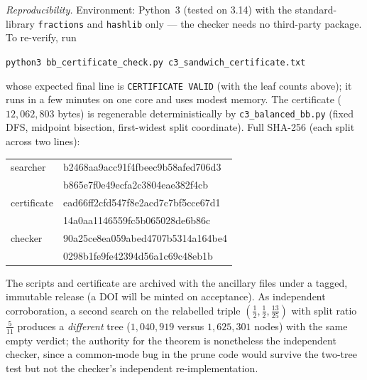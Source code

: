 \documentclass[11pt,reqno]{amsart}
\theoremstyle{plain}
\theoremstyle{definition}
\theoremstyle{remark}
\begin{document}
\emph{Reproducibility.} Environment: Python~3 (tested on 3.14) with the
standard-library \texttt{fractions} and \texttt{hashlib} only --- the checker
needs no third-party package. To re-verify, run
\begin{center}
\texttt{python3 bb\_certificate\_check.py c3\_sandwich\_certificate.txt}
\end{center}
whose expected final line is \texttt{CERTIFICATE VALID} (with the leaf counts
above); it runs in a few minutes on one core and uses modest memory. The certificate
($12{,}062{,}803$ bytes) is regenerable deterministically by
\texttt{c3\_balanced\_bb.py} (fixed DFS, midpoint bisection, first-widest split
coordinate). Full SHA-256 (each split across two lines):
\begin{center}\ttfamily\footnotesize
\begin{tabular}{@{}ll@{}}
searcher & b2468aa9acc91f4fbeec9b58afed706d3\\
 & b865e7f0e49ecfa2c3804eae382f4cb\\
certificate & ead66ff2cfd547f8e2acd7c7bf5cce67d1\\
 & 14a0aa1146559fc5b065028de6b86c\\
checker & 90a25ce8ea059abed4707b5314a164be4\\
 & 0298b1fe9fe42394d56a1c69c48eb1b\\
\end{tabular}
\end{center}
The scripts and certificate are archived with the ancillary files under a
tagged, immutable release (a DOI will be minted on acceptance). As independent
corroboration, a second search on the relabelled triple
$(\tfrac12,\tfrac12,\tfrac{13}{25})$ with split ratio $\tfrac5{11}$ produces a
\emph{different} tree ($1{,}040{,}919$ versus $1{,}625{,}301$ nodes) with the
same empty verdict; the authority for the theorem is nonetheless the
independent checker, since a common-mode bug in the prune code would survive
the two-tree test but not the checker's independent re-implementation.
\end{document}
